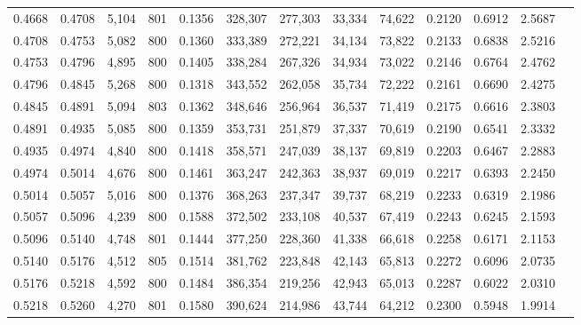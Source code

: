 \begin{tabular}{rrrrrrrrrrrrr}
0.4668 & 0.4708 &  5,104 & 801 &                                     0.1356 & 328,307 & 277,303 &  33,334 &  74,622 & 0.2120 & 0.6912 & 2.5687 \\
0.4708 & 0.4753 &  5,082 & 800 &                                     0.1360 & 333,389 & 272,221 &  34,134 &  73,822 & 0.2133 & 0.6838 & 2.5216 \\
0.4753 & 0.4796 &  4,895 & 800 &                                     0.1405 & 338,284 & 267,326 &  34,934 &  73,022 & 0.2146 & 0.6764 & 2.4762 \\
0.4796 & 0.4845 &  5,268 & 800 &                                     0.1318 & 343,552 & 262,058 &  35,734 &  72,222 & 0.2161 & 0.6690 & 2.4275 \\
0.4845 & 0.4891 &  5,094 & 803 &                                     0.1362 & 348,646 & 256,964 &  36,537 &  71,419 & 0.2175 & 0.6616 & 2.3803 \\
0.4891 & 0.4935 &  5,085 & 800 &                                     0.1359 & 353,731 & 251,879 &  37,337 &  70,619 & 0.2190 & 0.6541 & 2.3332 \\
0.4935 & 0.4974 &  4,840 & 800 &                                     0.1418 & 358,571 & 247,039 &  38,137 &  69,819 & 0.2203 & 0.6467 & 2.2883 \\
0.4974 & 0.5014 &  4,676 & 800 &                                     0.1461 & 363,247 & 242,363 &  38,937 &  69,019 & 0.2217 & 0.6393 & 2.2450 \\
0.5014 & 0.5057 &  5,016 & 800 &                                     0.1376 & 368,263 & 237,347 &  39,737 &  68,219 & 0.2233 & 0.6319 & 2.1986 \\
0.5057 & 0.5096 &  4,239 & 800 &                                     0.1588 & 372,502 & 233,108 &  40,537 &  67,419 & 0.2243 & 0.6245 & 2.1593 \\
0.5096 & 0.5140 &  4,748 & 801 &                                     0.1444 & 377,250 & 228,360 &  41,338 &  66,618 & 0.2258 & 0.6171 & 2.1153 \\
0.5140 & 0.5176 &  4,512 & 805 &                                     0.1514 & 381,762 & 223,848 &  42,143 &  65,813 & 0.2272 & 0.6096 & 2.0735 \\
0.5176 & 0.5218 &  4,592 & 800 &                                     0.1484 & 386,354 & 219,256 &  42,943 &  65,013 & 0.2287 & 0.6022 & 2.0310 \\
0.5218 & 0.5260 &  4,270 & 801 &                                     0.1580 & 390,624 & 214,986 &  43,744 &  64,212 & 0.2300 & 0.5948 & 1.9914 \\

\end{tabular}
